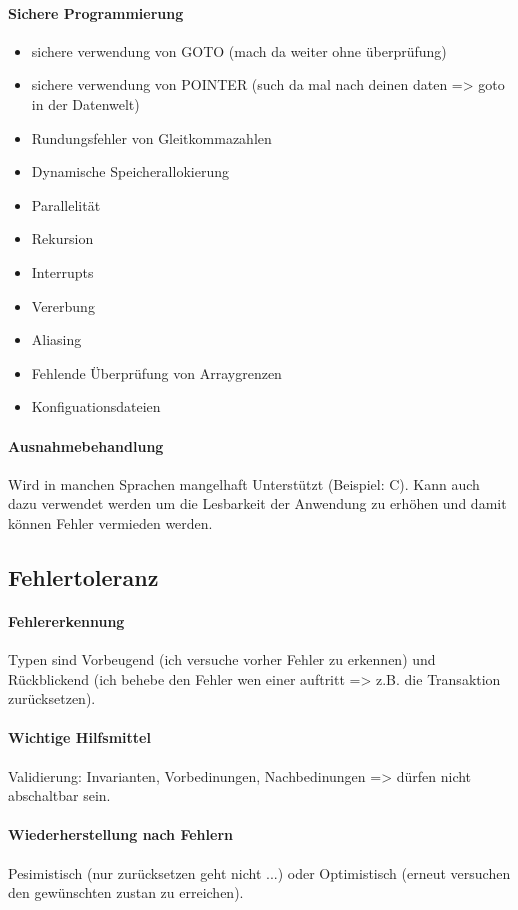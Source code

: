 \paragraph{Sichere Programmierung}
\begin{itemize}
\item sichere verwendung von GOTO (mach da weiter ohne überprüfung)
\item sichere verwendung von POINTER (such da mal nach deinen daten => goto in der Datenwelt)
\item Rundungsfehler von Gleitkommazahlen
\item Dynamische Speicherallokierung
\item Parallelität
\item Rekursion
\item Interrupts
\item Vererbung
\item Aliasing
\item Fehlende Überprüfung von Arraygrenzen
\item Konfiguationsdateien
\end{itemize}

\paragraph{Ausnahmebehandlung}
Wird in manchen Sprachen mangelhaft Unterstützt (Beispiel: C). Kann auch dazu verwendet werden um die Lesbarkeit der Anwendung zu erhöhen und damit können Fehler vermieden werden.

\subsection{Fehlertoleranz}

\paragraph{Fehlererkennung}
Typen sind Vorbeugend (ich versuche vorher Fehler zu erkennen) und Rückblickend (ich behebe den Fehler wen einer auftritt => z.B. die Transaktion zurücksetzen).

\paragraph{Wichtige Hilfsmittel}
Validierung: Invarianten, Vorbedinungen, Nachbedinungen => dürfen nicht abschaltbar sein.

\paragraph{Wiederherstellung nach Fehlern}
Pesimistisch (nur zurücksetzen geht nicht ...) oder Optimistisch (erneut versuchen den gewünschten zustan zu erreichen).

